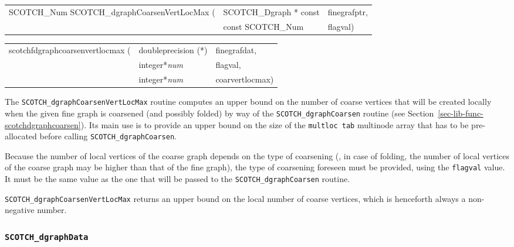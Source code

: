 \begin{itemize}
\progsyn

{\tt\begin{tabular}{l@{}ll}
SCOTCH\_Num SCOTCH\_dgraphCoarsenVertLocMax ( & SCOTCH\_Dgraph * const & finegrafptr, \\
                                              & const SCOTCH\_Num      & flagval) \\
\end{tabular}}

{\tt\begin{tabular}{l@{}ll}
scotchfdgraphcoarsenvertlocmax ( & doubleprecision (*) & finegrafdat, \\
                                 & integer*{\it num}   & flagval,     \\
                                 & integer*{\it num}   & coarvertlocmax)
\end{tabular}}

\progdes

The \texttt{SCOTCH\_dgraphCoarsen\lbt Vert\lbt Loc\lbt Max} routine
computes an upper bound on the number of coarse vertices that will be
created locally when the given fine graph is coarsened (and possibly
folded) by way of the \texttt{SCOTCH\_dgraph\lbt Coarsen} routine
(see Section~\ref{sec-lib-func-scotchdgraphcoarsen}). Its main use is
to provide an upper bound on the size of the \texttt{mult\lbt loc\lbt
  tab} multinode array that has to be pre-allocated before calling
\texttt{SCOTCH\_dgraph\lbt Coarsen}.

Because the number of local vertices of the coarse graph depends on
the type of coarsening (\eg, in case of folding, the number of local
vertices of the coarse graph may be higher than that of the fine
graph), the type of coarsening foreseen must be provided, using
the \texttt{flagval} value. It must be the same value as the one
that will be passed to the \texttt{SCOTCH\_dgraph\lbt Coarsen}
routine.

\progret

\texttt{SCOTCH\_dgraphCoarsen\lbt Vert\lbt Loc\lbt Max} returns an
upper bound on the local number of coarse vertices, which is
henceforth always a non-negative number.
\end{itemize}

\subsubsection{{\tt SCOTCH\_dgraphData}}
\label{sec-lib-func-scotchdgraphdata}

